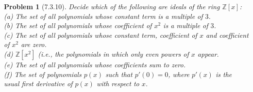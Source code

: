 \documentclass{article}
\newtheorem{problem}{Problem}
\begin{document}
\begin{problem}[7.3.10]
\label{examples}
Decide which of the following are ideals of the ring $\mathbb{Z}[x]$:\\
(a) The set of all polynomials whose constant term is a multiple of $3$.\\
(b) The set of all polynomials whose coefficient of $x^2$ is a multiple of $3$.\\
(c) The set of all polynomials whose constant term, coefficient of $x$ and coefficient of $x^2$ are zero.\\
(d) $\mathbb{Z}[x^2]$ (i.e., the polynomials in which only even powers of $x$ appear.\\
(e) The set of all polynomials whose coefficients sum to zero.\\
(f) The set of polynomials $p(x)$ such that $p'(0) = 0$, where $p'(x)$ is the usual first derivative of $p(x)$ with respect to $x$.
\end{problem}
\end{document}
